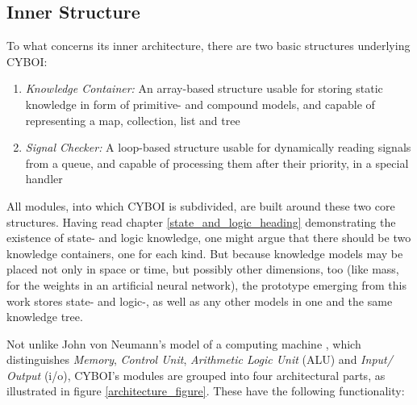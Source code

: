 %
%
%
%
%
%
%

\subsection{Inner Structure}
\label{inner_structure_heading}

To what concerns its inner architecture, there are two basic structures
underlying CYBOI:

\begin{enumerate}
    \item \emph{Knowledge Container:} An array-based structure usable for
        storing static knowledge in form of primitive- and compound models, and
        capable of representing a map, collection, list and tree
    \item \emph{Signal Checker:} A loop-based structure usable for dynamically
        reading signals from a queue, and capable of processing them after
        their priority, in a special handler
\end{enumerate}

All modules, into which CYBOI is subdivided, are built around these two core
structures. Having read chapter \ref{state_and_logic_heading} demonstrating the
existence of state- and logic knowledge, one might argue that there should be
two knowledge containers, one for each kind. But because knowledge models may
be placed not only in space or time, but possibly other dimensions, too (like
mass, for the weights in an artificial neural network), the prototype emerging
from this work stores state- and logic-, as well as any other models in one and
the same knowledge tree.

Not unlike John von Neumann's model of a computing machine \cite{selflinux},
which distinguishes \emph{Memory}, \emph{Control Unit},
\emph{Arithmetic Logic Unit} (ALU) and \emph{Input/ Output} (i/o), CYBOI's
modules are grouped into four architectural parts, as illustrated in figure
\ref{architecture_figure}. These have the following functionality:

